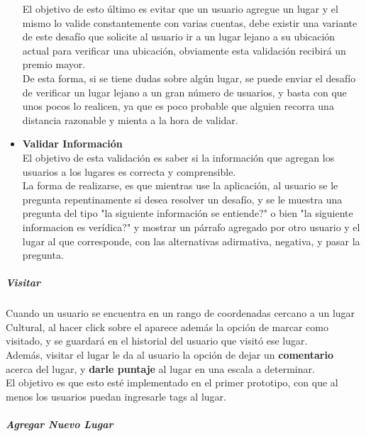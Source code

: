 \documentclass[10pt,letterpaper]{article}
\begin{document}
\begin{itemize}
El objetivo de esto último es evitar que un usuario agregue un lugar y el mismo lo valide constantemente con varias cuentas, debe existir una variante de este desafío que solicite al usuario ir a un lugar lejano a su ubicación actual para verificar una ubicación, obviamente esta validación recibirá un premio mayor.\\

De esta forma, si se tiene dudas sobre algún lugar, se puede enviar el desafío de verificar un lugar lejano a un gran número de usuarios, y basta con que unos pocos lo realicen, ya que es poco probable que alguien recorra una distancia  razonable y mienta a la hora de validar.\\

 \item \textbf{Validar Información} \\

El objetivo de esta validación es saber si la información que agregan los usuarios a los lugares es correcta y comprensible.\\

La forma de realizarse, es que mientras use la aplicación, al usuario se le pregunta repentinamente si desea resolver un desafío, y se le muestra una pregunta del tipo "la siguiente información se entiende?" o bien "la siguiente informacion es verídica?" y mostrar un párrafo agregado por otro usuario y el lugar al que corresponde, con las alternativas adirmativa, negativa, y pasar la pregunta.\\

\end{itemize}

\subparagraph{Visitar}

Cuando un usuario se encuentra en un rango de coordenadas cercano a un lugar Cultural, al hacer click sobre el aparece además la opción de marcar como visitado, y se guardará en el historial del usuario que visitó ese lugar.\\

Además, visitar el lugar le da al usuario la opción de dejar un \textbf{comentario} acerca del lugar, y \textbf{darle puntaje} al lugar en una escala a determinar.\\

El objetivo es que esto esté implementado en el primer prototipo, con que al menos los usuarios puedan ingresarle tags al lugar.\\

\subparagraph{Agregar Nuevo Lugar}
\end{document}
